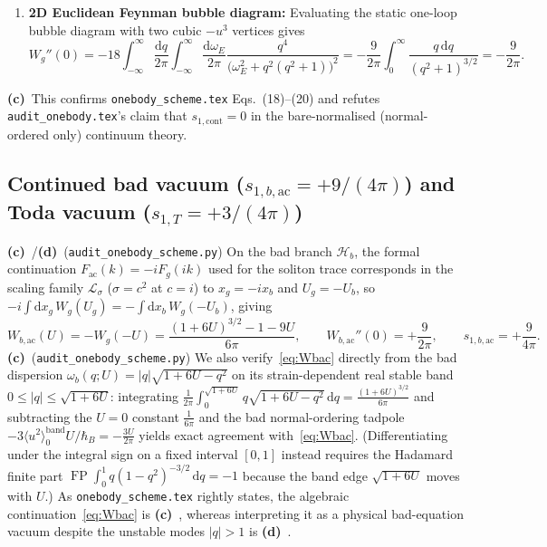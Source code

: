 \documentclass[11pt,a4paper]{article}
\newcommand{\Lc}{\textbf{(c)}\ }
\newcommand{\Ld}{\textbf{(d)}\ }
\newcommand{\dd}{\mathrm d}
\newcommand{\scr}{\texttt{audit\_\allowbreak onebody\_\allowbreak scheme.py}}
\begin{document}
\begin{enumerate}
\begin{equation}
    = -\frac{18U^2 q}{\sqrt{q^2+1}\bigl(\sqrt{q^2+1-6U}+\sqrt{q^2+1}\bigr)^2}
  \end{equation}
  eliminates catastrophic cancellation at large $q$ and reproduces~\eqref{eq:Wg} by direct
  infinite-line quadrature at $U \in \{0.02, -0.03, 0.05\}$ to $<10^{-65}$ (\scr).
  \item \textbf{2D Euclidean Feynman bubble diagram:}
  Evaluating the static one-loop bubble diagram with two cubic $-u^3$ vertices gives
  \begin{equation}
    W_g''(0) = -18\int_{-\infty}^{\infty}\frac{\dd q}{2\pi}\int_{-\infty}^{\infty}\frac{\dd\omega_E}{2\pi}
    \frac{q^4}{\bigl(\omega_E^2 + q^2(q^2+1)\bigr)^2}
    = -\frac{9}{2\pi}\int_0^\infty\frac{q\,\dd q}{(q^2+1)^{3/2}} = -\frac{9}{2\pi}.
  \end{equation}
\end{enumerate}
\Lc This confirms \texttt{onebody\_\allowbreak scheme.tex} Eqs.~(18)--(20) and refutes
\texttt{audit\_\allowbreak onebody.tex}'s claim that $s_{1,\mathrm{cont}} = 0$ in the
bare-normalised (normal-ordered only) continuum theory.

\subsection{\texorpdfstring{Continued bad vacuum ($s_{1,b,\mathrm{ac}} = +9/(4\pi)$) and Toda vacuum ($s_{1,T} = +3/(4\pi)$)}{Continued bad vacuum (s1bac = +9/(4 pi)) and Toda vacuum (s1T = +3/(4 pi))}}
\Lc/\Ld (\scr) On the bad branch $\mathcal{H}_b$, the formal continuation
$F_{\mathrm{ac}}(k) = -iF_g(ik)$ used for the soliton trace corresponds in the
scaling family $\mathcal{L}_\sigma$ ($\sigma = c^2$ at $c=i$) to $x_g = -ix_b$
and $U_g = -U_b$, so $-i\int\dd x_g\,W_g(U_g) = -\int\dd x_b\,W_g(-U_b)$, giving
\begin{equation}
  W_{b,\mathrm{ac}}(U) = -W_g(-U) = \frac{(1+6U)^{3/2} - 1 - 9U}{6\pi},
  \qquad
  W_{b,\mathrm{ac}}''(0) = +\frac{9}{2\pi},
  \qquad
  s_{1,b,\mathrm{ac}} = +\frac{9}{4\pi}.
  \label{eq:Wbac}
\end{equation}
\Lc (\scr) We also verify~\eqref{eq:Wbac} directly from the bad dispersion
$\omega_b(q;U) = |q|\sqrt{1+6U-q^2}$ on its strain-dependent real stable band
$0 \le |q| \le \sqrt{1+6U}$: integrating
$\frac{1}{2\pi}\int_0^{\sqrt{1+6U}} q\sqrt{1+6U-q^2}\,\dd q = \frac{(1+6U)^{3/2}}{6\pi}$
and subtracting the $U=0$ constant $\frac{1}{6\pi}$ and the bad normal-ordering
tadpole $-3\langle u^2\rangle_0^{\mathrm{band}}U/\hbar_B = -\frac{3U}{2\pi}$ yields
exact agreement with~\eqref{eq:Wbac}. (Differentiating under the integral sign on a
fixed interval $[0,1]$ instead requires the Hadamard finite part
$\operatorname{FP}\int_0^1 q(1-q^2)^{-3/2}\,\dd q = -1$ because the band edge
$\sqrt{1+6U}$ moves with $U$.) As \texttt{onebody\_\allowbreak scheme.tex} rightly states,
the algebraic continuation~\eqref{eq:Wbac} is \Lc, whereas interpreting it as a
physical bad-equation vacuum despite the unstable modes $|q|>1$ is \Ld.
\end{document}
